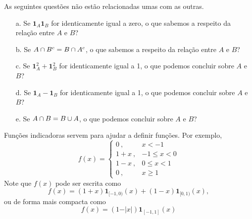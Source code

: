 \begin{frame}
\vspace{-0.2cm}
\begin{exem}
	As seguintes questões não estão relacionadas umas com as
	outras.
	\begin{enumerate}
		\item[a.] Se $\mathbf{1}_A\mathbf{1}_B$ for identicamente igual a zero, o que sabemos a respeito da relação entre $A$ e $B$?
		\item[b.] Se $A\cap B^c=B\cap A^c$, o que sabemos a respeito da relação entre $A$ e $B$?
		\item[c.] Se $\mathbf{1}_A^2+\mathbf{1}_B^2$ for identicamente igual a 1, o que podemos
		concluir sobre $A$ e $B$?
		\item[d.] Se $\mathbf{1}_A-\mathbf{1}_B$ for identicamente igual a 1,  o que podemos
		concluir sobre $A$ e $B$?
		\item[e.] Se $A\cap B=B\cup A$, o que podemos
		concluir sobre $A$ e $B$?
	\end{enumerate}
\end{exem}
	\begin{exem}
		Funções indicadoras servem para ajudar a definir funções. Por exemplo, 
		$$f(x)= \begin{cases}
		0 \ , & x <-1\\
		1+x \ , & -1 \leq x < 0\\
		1-x \ , & 0 \leq x < 1\\
		0 \ , & x \geq 1
		\end{cases} $$
		Note que $f(x)$ pode ser escrita como
		$$
		f(x)=(1+x)\mathbf{1}_{[-1,0)}(x)+(1-x)\mathbf{1}_{[0,1)}(x),
		$$
		ou de forma mais compacta como
		$$f(x)=(1-\vert x\vert)\mathbf{1}_{[-1,1]}(x) $$
	\end{exem}

\end{frame}





